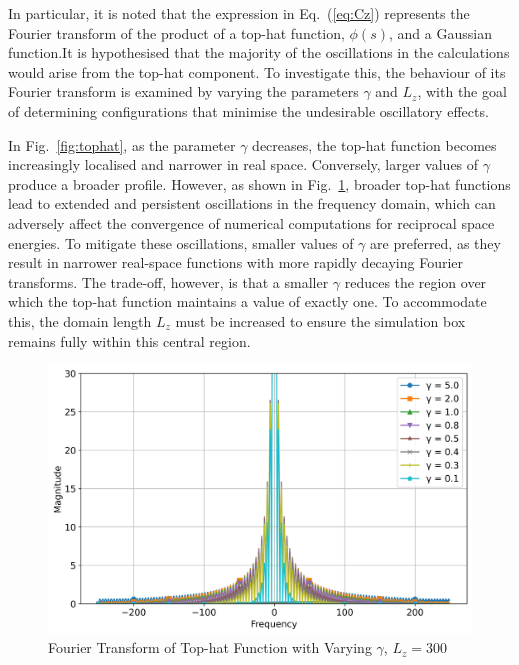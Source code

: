 In particular, it is noted that the expression in Eq.~(\ref{eq:Cz}) represents the Fourier transform of the product of a top-hat function, $\phi(s)$, and a Gaussian function.It is hypothesised that the majority of the oscillations in the calculations would arise from the top-hat component. To investigate this, the behaviour of its Fourier transform is examined by varying the parameters $\gamma$ and $L_z$, with the goal of determining configurations that minimise the undesirable oscillatory effects.

In Fig.~\ref{fig:tophat}, as the parameter $\gamma$ decreases, the top-hat function becomes increasingly localised and narrower in real space. Conversely, larger values of $\gamma$ produce a broader profile. However, as shown in Fig.~\ref{fig:fourieroftophatvarygammaL300}, broader top-hat functions lead to extended and persistent oscillations in the frequency domain, which can adversely affect the convergence of numerical computations for reciprocal space energies. To mitigate these oscillations, smaller values of $\gamma$ are preferred, as they result in narrower real-space functions with more rapidly decaying Fourier transforms. The trade-off, however, is that a smaller $\gamma$ reduces the region over which the top-hat function maintains a value of exactly one. To accommodate this, the domain length $L_z$ must be increased to ensure the simulation box remains fully within this central region.

\begin{figure}[htbp]
  \centering
  \includegraphics[width=\linewidth]{images/fourieroftophatvarygammaL300.jpg}
  \caption{Fourier Transform of Top-hat Function with Varying $\gamma$, $L_z = 300$}
  \label{fig:fourieroftophatvarygammaL300}
\end{figure}
  
